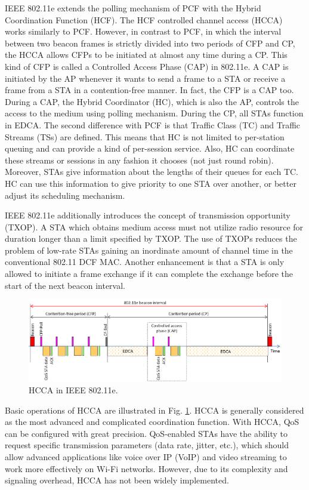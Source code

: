 \documentclass[journal,draftclsnofoot,12pt,onecolumn]{IEEEtran}
\begin{document}
IEEE 802.11e extends the polling mechanism of PCF with the Hybrid Coordination Function (HCF). The HCF controlled channel access (HCCA) works similarly to PCF. However, in contrast to PCF, in which the interval between two beacon frames is strictly divided into two periods of CFP and CP, the HCCA allows CFPs to be initiated at almost any time during a CP. This kind of CFP is called a Controlled Access Phase (CAP) in 802.11e. A CAP is initiated by the AP whenever it wants to send a frame to a STA or receive a frame from a STA in a contention-free manner. In fact, the CFP is a CAP too. During a CAP, the Hybrid Coordinator (HC), which is also the AP, controls the access to the medium using polling mechanism. During the CP, all STAs function in EDCA. The second difference with PCF is that Traffic Class (TC) and Traffic Streams (TSs) are defined. This means that HC is not limited to per-station queuing and can provide a kind of per-session service. Also, HC can coordinate these streams or sessions in any fashion it chooses (not just round robin). Moreover, STAs give information about the lengths of their queues for each TC. HC can use this information to give priority to one STA over another, or better adjust its scheduling mechanism.

IEEE 802.11e additionally introduces the concept of transmission opportunity (TXOP). A STA which obtains medium access must not utilize radio resource for duration longer than a limit specified by TXOP. The use of TXOPs reduces the problem of low-rate STAs gaining an inordinate amount of channel time in the conventional 802.11 DCF MAC. Another enhancement is that a STA is only allowed to initiate a frame exchange if it can complete the exchange before the start of the next beacon interval.

\begin{figure}[!t]
\centering
\includegraphics[width=1.0\columnwidth]{figures2/802-11e-HCCA}
\caption{HCCA in IEEE 802.11e.}
\label{figs:802-11e-HCCA}
\end{figure}

Basic operations of HCCA are illustrated in Fig. \ref{figs:802-11e-HCCA}. HCCA is generally considered as the most advanced and complicated coordination function. With HCCA, QoS can be configured with great precision. QoS-enabled STAs have the ability to request specific transmission parameters (data rate, jitter, etc.), which should allow advanced applications like voice over IP (VoIP) and video streaming to work more effectively on Wi-Fi networks. However, due to its complexity and signaling overhead, HCCA has not been widely implemented.
\end{document}

